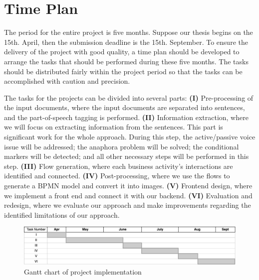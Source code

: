 \chapter{Time Plan}

The period for the entire project is five months. Suppose our thesis begins on the 15th. April, then the submission deadline is the 15th. September. To ensure the delivery of the project with good quality, a time plan should be developed to arrange the tasks that should be performed during these five months. The tasks should be distributed fairly within the project period so that the tasks can be accomplished with caution and precision.

The tasks for the projects can be divided into several parts: \textbf{(I)} Pre-processing of the input documents, where the input documents are separated into sentences, and the part-of-speech tagging is performed. \textbf{(II)} Information extraction, where we will focus on extracting information from the sentences. This part is significant work for the whole approach. During this step, the active/passive voice issue will be addressed; the anaphora problem will be solved; the conditional markers will be detected; and all other necessary steps will be performed in this step. \textbf{(III)} Flow generation, where each business activity's interactions are identified and connected. \textbf{(IV)} Post-processing, where we use the flows to generate a BPMN model and convert it into images. \textbf{(V)} Frontend design, where we implement a front end and connect it with our backend. \textbf{(VI)} Evaluation and redesign, where we evaluate our approach and make improvements regarding the identified limitations of our approach.

\begin{figure}[h]
    \centering
    \caption{Gantt chart of project implementation}
    \includegraphics[width=1\textwidth]{tum-resources/images/time_plan.png}
\end{figure}
